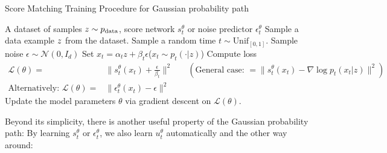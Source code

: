 \begin{algorithm}[h]
\caption{Score Matching Training Procedure for Gaussian probability path}
\label{alg:training_score_matching_gaussian_paths}
\begin{algorithmic}[1]
\REQUIRE A dataset of samples $z\sim p_{\rm{data}}$, score network $s_t^\theta$ or noise predictor $\epsilon_t^\theta$
    \STATE Sample a data example $z$ from the dataset.
    \STATE Sample a random time $t \sim \text{Unif}_{[0,1]}$.
    \STATE Sample noise $\epsilon\sim\mathcal{N}(0,I_d)$
    \STATE Set $x_t=\alpha_t z + \beta_t\epsilon$\hfill ($x_t\sim p_t(\cdot|z)$)
    \STATE Compute loss
    \begin{align*}
        \mathcal{L}(\theta) =& \|s_t^\theta(x_t)+\frac{\epsilon}{\beta_t}\|^2 \quad &(\text{General case: }=\|s_t^\theta(x_t)-\nabla\log p_t(x_t|z)\|^2)\\
    \text{Alternatively: }\mathcal{L}(\theta) =& \|\epsilon_t^\theta(x_t)-\epsilon\|^2
    \end{align*}
    \STATE Update the model parameters $\theta$ via gradient descent on $\mathcal{L}(\theta)$.
\ENDFOR
\end{algorithmic}
\end{algorithm}
Beyond its simplicity, there is another useful property of the Gaussian probability path: By learning $s_t^\theta$ or $\epsilon_t^\theta$, we also learn $u_t^\theta$ automatically and the other way around:

